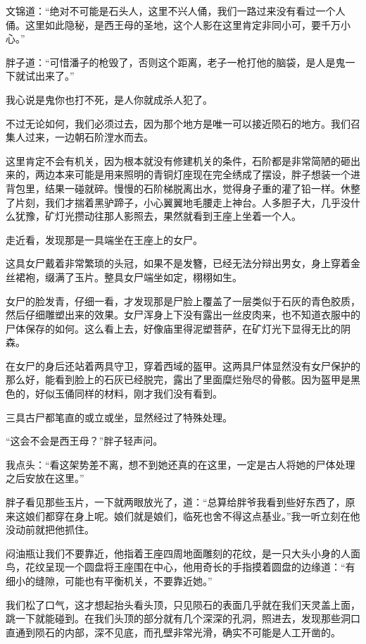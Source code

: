 文锦道：“绝对不可能是石头人，这里不兴人俑，我们一路过来没有看过一个人俑。这里如此隐秘，是西王母的圣地，这个人影在这里肯定非同小可，要千万小心。”

胖子道：“可惜潘子的枪毁了，否则这个距离，老子一枪打他的脑袋，是人是鬼一下就试出来了。”

我心说是鬼你也打不死，是人你就成杀人犯了。

不过无论如何，我们必须过去，因为那个地方是唯一可以接近陨石的地方。我们召集人过来，一边朝石阶漟水而去。

这里肯定不会有机关，因为根本就没有修建机关的条件，石阶都是非常简陋的砸出来的，两边本来可能是用来照明的青铜灯座现在完全绣成了摆设，胖子想装一个进背包里，结果一碰就碎。慢慢的石阶梯脱离出水，觉得身子重的灌了铅一样。休整了片刻，我们才揣着黑驴蹄子，小心翼翼地毛腰走上神台。人多胆子大，几乎没什么犹豫，矿灯光攒动往那人影照去，果然就看到王座上坐着一个人。

走近看，发现那是一具端坐在王座上的女尸。

这具女尸戴着非常繁琐的头冠，如果不是发簪，已经无法分辩出男女，身上穿着金丝裙袍，缀满了玉片。整具女尸端坐如定，栩栩如生。

女尸的脸发青，仔细一看，才发现那是尸脸上覆盖了一层类似于石灰的青色胶质，然后仔细雕塑出来的效果。女尸浑身上下没有露出一丝皮肉来，也不知道衣服中的尸体保存的如何。这么看上去，好像庙里得泥塑菩萨，在矿灯光下显得无比的阴森。

在女尸的身后还站着两具守卫，穿着西域的盔甲。这两具尸体显然没有女尸保护的那么好，能看到脸上的石灰已经脱完，露出了里面糜烂殆尽的骨骸。因为盔甲是黑色的，好似玉俑同样的材料，刚才我们没有看到。

三具古尸都笔直的或立或坐，显然经过了特殊处理。

“这会不会是西王母？”胖子轻声问。

我点头：“看这架势差不离，想不到她还真的在这里，一定是古人将她的尸体处理之后安放在这里。”

胖子看见那些玉片，一下就两眼放光了，道：“总算给胖爷我看到些好东西了，原来这娘们都穿在身上呢。娘们就是娘们，临死也舍不得这点基业。”我一听立刻在他没动前就把他抓住。

闷油瓶让我们不要靠近，他指着王座四周地面雕刻的花纹，是一只大头小身的人面鸟，花纹呈现一个圆盘将王座围在中心，他用奇长的手指摸着圆盘的边缘道：“有细小的缝隙，可能也有平衡机关，不要靠近她。”

我们松了口气，这才想起抬头看头顶，只见陨石的表面几乎就在我们天灵盖上面，跳一下就能碰到。在我们头顶的部分就有几个深深的孔洞，照进去，发现那些洞口直通到陨石的内部，深不见底，而孔壁非常光滑，确实不可能是人工开凿的。

